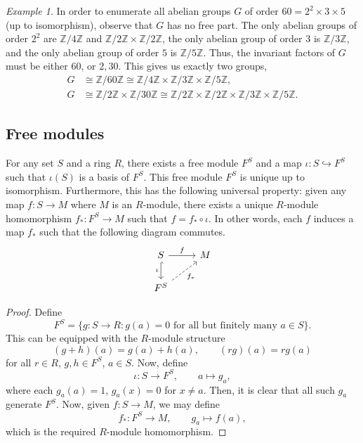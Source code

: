 \documentclass[11pt]{article}
\newcommand{\Z}{\mathbb{Z}}
\theoremstyle{definition}
\theoremstyle{remark}
\newtheorem*{example}{Example}
\numberwithin{equation}{section}
\begin{document}
    \begin{example}
        In order to enumerate all abelian groups $G$ of order $60 = 2^2 \times 3
        \times 5$ (up to isomorphism), observe that $G$ has no free part. The only
        abelian groups of order $2^2$ are $\Z/4\Z$ and $\Z/2\Z\times \Z/2\Z$, the
        only abelian group of order $3$ is $\Z/3\Z$, and the only abelian group of
        order $5$ is $\Z/5\Z$. Thus, the invariant factors of $G$ must be either
        $60$, or $2, 30$. This gives us exactly two groups, \begin{align*}
            G &\cong \Z/60\Z \cong \Z/4\Z \times \Z/3\Z \times \Z/5\Z, \\
            G &\cong \Z/2\Z \times \Z/30\Z \cong \Z/2\Z\times \Z/2\Z \times \Z/3\Z
            \times \Z/5\Z.
        \end{align*}
    \end{example}

    \subsection{Free modules}

    \begin{theorem}
        For any set $S$ and a ring $R$, there exists a free module $F^S$ and a map
        $\iota\colon S \hookrightarrow F^S$ such that $\iota(S)$ is a basis of $F^S$.
        This free module $F^S$ is unique up to isomorphism.  Furthermore, this has
        the following universal property: given any map $f\colon S \to M$ where $M$
        is an $R$-module, there exists a unique $R$-module homomorphism $f_*\colon
        F^S \to M$ such that $f = f_*\circ \iota$. In other words, each $f$ induces a
        map $f_*$ such that the following diagram commutes. \[
            \begin{tikzcd}
                S & M \\
                {F^S}
                \arrow["f", from=1-1, to=1-2]
                \arrow["\iota"', hook, from=1-1, to=2-1]
                \arrow["{f_*}"', dashed, from=2-1, to=1-2]
            \end{tikzcd} 
        \]
    \end{theorem}
    \begin{proof}
        Define \[
            F^S = \{g\colon S \to R: g(a) = 0\text{ for all but finitely many } a \in
            S\}.
        \] This can be equipped with the $R$-module structure \[
            (g + h)(a) = g(a) + h(a), \qquad
            (rg)(a) = r g(a)
        \] for all $r \in R$, $g, h \in F^S$, $a \in S$. Now, define \[
            \iota\colon S \to F^S, \qquad a \mapsto g_a,
        \] where each $g_a(a) = 1$, $g_a(x) = 0$ for $x \neq a$. Then, it is clear
        that all such $g_a$ generate $F^S$. Now, given $f\colon S \to M$, we may
        define \[
            f_*\colon F^S \to M, \qquad g_a \mapsto f(a),
        \] which is the required $R$-module homomorphism.
    \end{proof}
\end{document}
